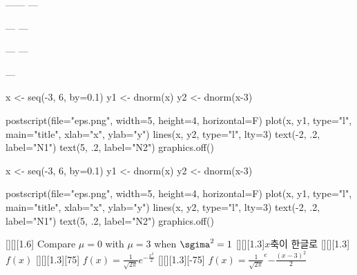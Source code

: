 \documentclass[11pt]{article}
\begin{document}
\begin{center}
------
---\begin{turn}{30}
\end{turn}---
---\begin{rotate}{30}
\end{rotate}---
---\begin{sideways}
\end{sideways}---
\end{center}

x <- seq(-3, 6, by=0.1)
y1 <- dnorm(x)
y2 <- dnorm(x-3)

postscript(file="eps.png", width=5, height=4, horizontal=F)
plot(x, y1, type="l", main="title", xlab="x", ylab="y")
lines(x, y2, type="l", lty=3)
text(-2, .2, label="N1")
text(5, .2, label="N2")
graphics.off()

x <- seq(-3, 6, by=0.1)
y1 <- dnorm(x)
y2 <- dnorm(x-3)

postscript(file="eps.png", width=5, height=4, horizontal=F)
plot(x, y1, type="l", main="title", xlab="x", ylab="y")
lines(x, y2, type="l", lty=3)
text(-2, .2, label="N1")
text(5, .2, label="N2")
graphics.off()

[][][1.6]
{Compare $\mu=0$ with $\mu=3$ when $\sgima^2=1$}
[][][1.3]{$x$축이 한글로}
[][][1.3]{$f(x)$}
[][][1.3][75]
{$f(x)=\frac{1}{\sqrt{2\pi}}e^{-\frac{x^2}{2}}$}
[][][1.3][-75]
{$f(x)=\frac{1}{\sqrt{2\pi}}^e{-\frac{(x-3)^2}{2}}$}
\end{document}
